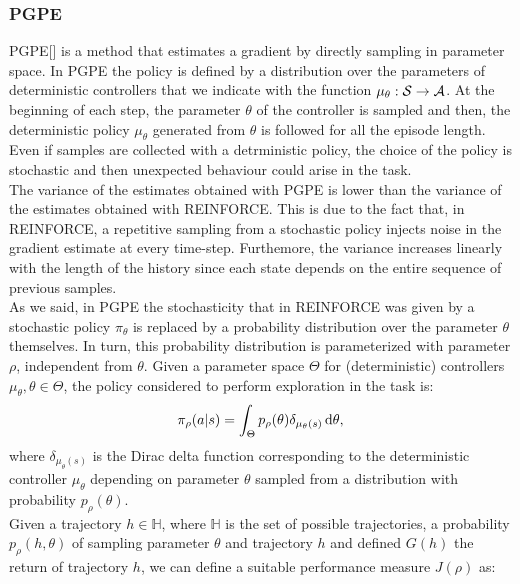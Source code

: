 \subsubsection{PGPE} \label{subsec:pgpe}
\acf{PGPE}[\citet{sehnke2008PolicyGradient}] is a method that estimates a gradient by directly sampling in parameter space. In \ac{PGPE} the policy is defined by a distribution over the parameters of deterministic controllers that we indicate with the function $\mu_{\theta}: \mathcal{S} \to \mathcal{A}$. At the beginning of each step, the parameter $\theta$ of the controller is sampled and then, the deterministic policy $\mu_{\theta}$ generated from $\theta$ is followed for all the episode length. Even if samples are collected with a detrministic policy, the choice of the policy is stochastic and then unexpected behaviour could arise in the task.\\
\newline
The variance of the estimates obtained with \ac{PGPE} is lower than the variance of the estimates obtained with REINFORCE. This is due to the fact that, in REINFORCE, a repetitive sampling from a stochastic policy injects noise in the gradient estimate at every time-step. Furthemore, the variance increases linearly with the length of the history since each state depends on the entire sequence of previous samples.\\
\newline
As we said, in \ac{PGPE} the stochasticity that in REINFORCE was given by a stochastic policy $\pi_{\theta}$ is replaced by a probability distribution over the parameter $\theta$ themselves. In turn, this probability distribution is parameterized with parameter $\rho$, independent from $\theta$. Given a parameter space $\Theta$ for (deterministic) controllers $\mu_{\theta}, \theta \in \Theta$, the policy considered to perform exploration in the task is:
\begin{align}
\pi_{\rho}(a|s) = \int_{\Theta} p_{\rho}(\theta) \delta_{\mu_{\theta}(s)}\,\mathrm{d} \theta,
\end{align}
where $\delta_{\mu_{\theta}(s)}$ is the Dirac delta function corresponding to the deterministic controller $\mu_{\theta}$ depending on parameter $\theta$ sampled from a distribution with probability $p_{\rho}(\theta)$.\\
\newline
Given a trajectory $h \in \mathbb{H}$, where $\mathbb{H}$ is the set of possible trajectories, a probability $p_{\rho}(h, \theta)$ of sampling parameter $\theta$ and trajectory $h$ and defined $G(h)$ the return of trajectory $h$, we can define a suitable performance measure $J(\rho)$ as:
